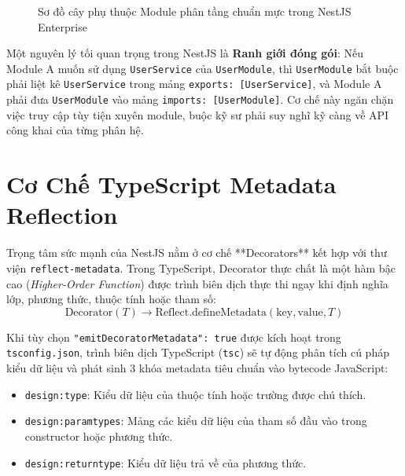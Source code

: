 \documentclass[12pt,a4paper,oneside]{book}
\begin{document}
\begin{figure}[htbp]
{
  }
  \caption{Sơ đồ cây phụ thuộc Module phân tầng chuẩn mực trong NestJS Enterprise}
  \label{fig:module-tree-pedagogy}
\end{figure}

Một nguyên lý tối quan trọng trong NestJS là \textbf{Ranh giới đóng gói}: Nếu Module A muốn sử dụng \texttt{UserService} của \texttt{UserModule}, thì \texttt{UserModule} bắt buộc phải liệt kê \texttt{UserService} trong mảng \texttt{exports: [UserService]}, và Module A phải đưa \texttt{UserModule} vào mảng \texttt{imports: [UserModule]}. Cơ chế này ngăn chặn việc truy cập tùy tiện xuyên module, buộc kỹ sư phải suy nghĩ kỹ càng về API công khai của từng phân hệ.

\section{Cơ Chế TypeScript Metadata Reflection}
Trọng tâm sức mạnh của NestJS nằm ở cơ chế **Decorators** kết hợp với thư viện \texttt{reflect-metadata}. Trong TypeScript, Decorator thực chất là một hàm bậc cao (\textit{Higher-Order Function}) được trình biên dịch thực thi ngay khi định nghĩa lớp, phương thức, thuộc tính hoặc tham số:
\begin{equation}
  \text{Decorator}(T) \longrightarrow \text{Reflect.defineMetadata}(\text{key}, \text{value}, T)
\end{equation}

Khi tùy chọn \texttt{"emitDecoratorMetadata": true} được kích hoạt trong \texttt{tsconfig.json}, trình biên dịch TypeScript (\texttt{tsc}) sẽ tự động phân tích cú pháp kiểu dữ liệu và phát sinh 3 khóa metadata tiêu chuẩn vào bytecode JavaScript:
\begin{itemize}
  \item \texttt{design:type}: Kiểu dữ liệu của thuộc tính hoặc trường được chú thích.
  \item \texttt{design:paramtypes}: Mảng các kiểu dữ liệu của tham số đầu vào trong constructor hoặc phương thức.
  \item \texttt{design:returntype}: Kiểu dữ liệu trả về của phương thức.
\end{itemize}
\end{document}

